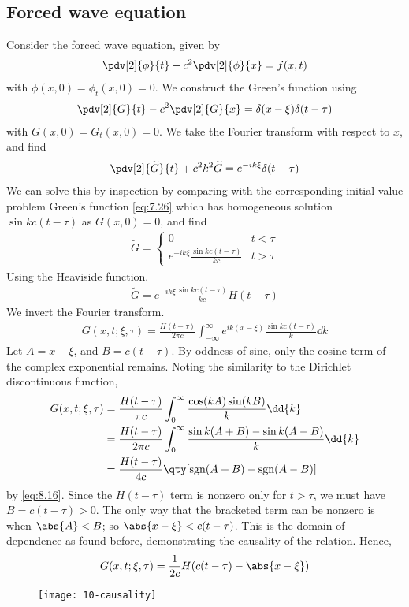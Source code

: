 \subsection{Forced wave equation}
Consider the forced wave equation, given by
\begin{align} \label{eq:10.10}
	\pdv[2]{\phi}{t} - c^2 \pdv[2]{\phi}{x} = f(x,t)
\end{align}
with $\phi(x,0) = \phi_t(x,0) = 0$.
We construct the Green's function using
\begin{align*}
	\pdv[2]{G}{t} - c^2 \pdv[2]{G}{x} = \delta(x-\xi)\delta(t-\tau)
\end{align*}
with $G(x,0) = G_t(x,0) = 0$.
We take the Fourier transform with respect to $x$, and find
\begin{align*}
	\pdv[2]{\widetilde G}{t} + c^2 k^2 \widetilde G = e^{-ik\xi} \delta(t - \tau)
\end{align*}
We can solve this by inspection by comparing with the corresponding initial value problem Green's function \cref{eq:7.26} which has homogeneous solution $\sin kc (t - \tau)$ as $G(x,0) = 0$, and find
\begin{align*}
	\widetilde G = \begin{cases}
		0                                       & t < \tau \\
		e^{-ik\xi} \frac{\sin kc(t - \tau)}{kc} & t > \tau
	\end{cases}
\end{align*}
Using the Heaviside function.
\begin{align*}
	\widetilde G = e^{-ik\xi} \frac{\sin kc(t - \tau)}{kc} H(t - \tau)
\end{align*}
We invert the Fourier transform.
\begin{align*}
	G(x,t;\xi,\tau) = \frac{H(t-\tau)}{2\pi c} \int_{-\infty}^\infty e^{ik(x - \xi)} \frac{\sin kc(t - \tau)}{k} \dd{k}
\end{align*}
Let $A = x - \xi$, and $B = c(t - \tau)$.
By oddness of sine, only the cosine term of the complex exponential remains.
Noting the similarity to the Dirichlet discontinuous function,
\begin{align*}
	G(x,t;\xi,\tau) & = \frac{H(t-\tau)}{\pi c} \int_0^\infty \frac{\cos(kA) \sin(kB)}{k} \dd{k} \\
	& = \frac{H(t-\tau)}{2\pi c} \int_0^\infty \frac{\sin k(A+B) - \sin k(A-B)}{k} \dd{k} \\
	& = \frac{H(t-\tau)}{4c} \qty[ \sgn(A+B) - \sgn(A-B) ]
\end{align*}
by \cref{eq:8.16}.
Since the $H(t - \tau)$ term is nonzero only for $t > \tau$, we must have $B = c(t-\tau) > 0$.
The only way that the bracketed term can be nonzero is when $\abs{A} < B$; so $\abs{x - \xi} < c(t-\tau)$.
This is the domain of dependence as found before, demonstrating the causality of the relation.
Hence,
\begin{align} \label{eq:10.11}
	G(x,t;\xi,\tau) = \frac{1}{2c} H(c(t-\tau) - \abs{x - \xi})
\end{align}
\begin{figure}[h]
    \centering
    \texttt{[image: 10-causality]}
\end{figure}

